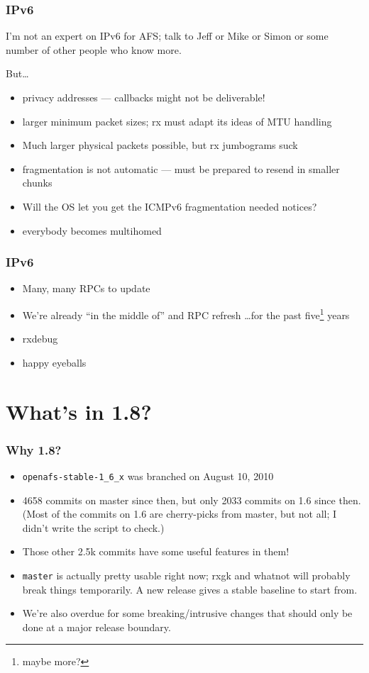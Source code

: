 \documentclass{beamer}
\begin{document}
\begin{frame}
\frametitle{IPv6}
I'm not an expert on IPv6 for AFS; talk to Jeff or Mike or Simon
or some number of other people who know more.

But\ldots
\begin{itemize}
\item{privacy addresses --- callbacks might not be deliverable!}
\item{larger minimum packet sizes; rx must adapt its ideas of MTU handling}
\item{Much larger physical packets possible, but rx jumbograms suck}
\item{fragmentation is not automatic --- must be prepared to resend
	in smaller chunks}
\item{Will the OS let you get the ICMPv6 fragmentation needed notices?}
\item{everybody becomes multihomed}
\end{itemize}
\end{frame}
\begin{frame}
\frametitle{IPv6}
\begin{itemize}
\item{Many, many RPCs to update}
\item{We're already ``in the middle of'' and RPC refresh \ldots for the
	past five\footnote{maybe more?} years}
\item{rxdebug}
\item{happy eyeballs}
\end{itemize}
\end{frame}

\section{What's in 1.8?}

\begin{frame}[fragile]
\frametitle{Why 1.8?}
\begin{itemize}
\item{\verb+openafs-stable-1_6_x+ was branched on August 10, 2010}
\item{4658 commits on master since then, but only 2033 commits on
1.6 since then.  (Most of the commits on 1.6 are cherry-picks from
master, but not all; I didn't write the script to check.)}
\item{Those other 2.5k commits have some useful features in them!}
\item{\verb+master+ is actually pretty usable right now; rxgk and
whatnot will probably break things temporarily.  A new release gives
a stable baseline to start from.}
\item{We're also overdue for some breaking/intrusive changes that
should only be done at a major release boundary.}
\end{itemize}
\end{frame}
\end{document}
